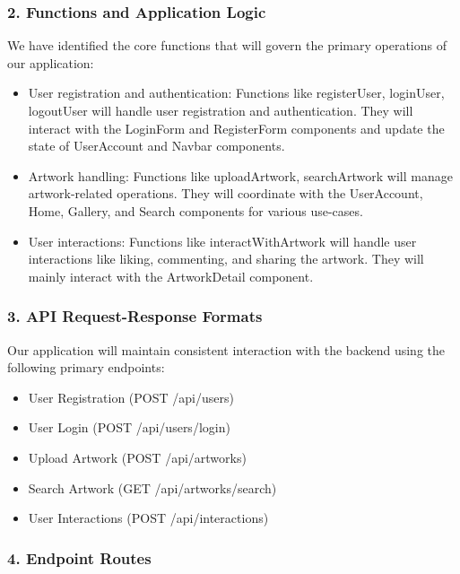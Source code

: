 \documentclass[11pt]{article}
\begin{document}
\subsubsection{2. Functions and Application Logic}
\label{sec:org7b21e39}

We have identified the core functions that will govern the primary operations of
our application: 

\begin{itemize}
\item User registration and authentication: Functions like registerUser, loginUser,
logoutUser will handle user registration and authentication. They will
interact with the LoginForm and RegisterForm components and update the state
of UserAccount and Navbar components.

\item Artwork handling: Functions like uploadArtwork, searchArtwork will manage
artwork-related operations. They will coordinate with the UserAccount, Home,
Gallery, and Search components for various use-cases.

\item User interactions: Functions like interactWithArtwork will handle user
interactions like liking, commenting, and sharing the artwork. They will
mainly interact with the ArtworkDetail component.
\end{itemize}

\subsubsection{3. API Request-Response Formats}
\label{sec:org5667352}

Our application will maintain consistent interaction with the backend using the
following primary endpoints:

\begin{itemize}
\item User Registration (POST /api/users)
\item User Login (POST /api/users/login)
\item Upload Artwork (POST /api/artworks)
\item Search Artwork (GET /api/artworks/search)
\item User Interactions (POST /api/interactions)
\end{itemize}

\subsubsection{4. Endpoint Routes}
\label{sec:org321e844}
\end{document}
